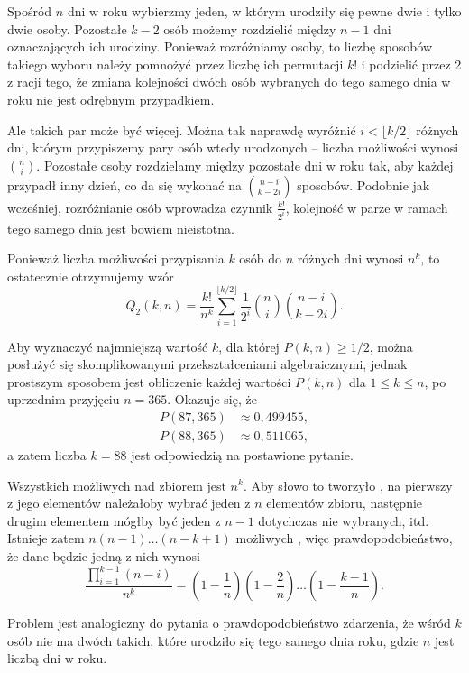 Spośród $n$ dni w roku wybierzmy jeden, w którym urodziły się pewne dwie i tylko dwie osoby. Pozostałe $k-2$ osób możemy rozdzielić między $n-1$ dni oznaczających ich urodziny. Ponieważ rozróżniamy osoby, to liczbę sposobów takiego wyboru należy pomnożyć przez liczbę ich permutacji $k!$ i podzielić przez 2 z racji tego, że zmiana kolejności dwóch osób wybranych do tego samego dnia w roku nie jest odrębnym przypadkiem.

Ale takich par może być więcej. Można tak naprawdę wyróżnić $i<\lfloor k/2\rfloor$ różnych dni, którym przypiszemy pary osób wtedy urodzonych -- liczba możliwości wynosi $\binom{n}{i}$. Pozostałe osoby rozdzielamy między pozostałe dni w roku tak, aby każdej przypadł inny dzień, co da się wykonać na $\binom{n-i}{k-2i}$ sposobów. Podobnie jak wcześniej, rozróżnianie osób wprowadza czynnik $\frac{k!}{2^i}$, kolejność w parze w ramach tego samego dnia jest bowiem nieistotna.

Ponieważ liczba możliwości przypisania $k$ osób do $n$ różnych dni wynosi $n^k$, to ostatecznie otrzymujemy wzór
\[
    Q_2(k,n) = \frac{k!}{n^k}\sum_{i=1}^{\lfloor k/2\rfloor}\frac{1}{2^i}\binom{n}{i}\binom{n-i}{k-2i}.
\]

Aby wyznaczyć najmniejszą wartość $k$, dla której $P(k,n)\ge1/2$, można posłużyć się skomplikowanymi przekształceniami algebraicznymi, jednak prostszym sposobem jest obliczenie każdej wartości $P(k,n)$ dla $1\le k\le n$, po uprzednim przyjęciu $n=365$. Okazuje się, że
\begin{align*}
	P(87,365) &\approx 0{,}499455, \\
    P(88,365) &\approx 0{,}511065,
\end{align*}
a zatem liczba $k=88$ jest odpowiedzią na postawione pytanie.

\exercise %
Wszystkich możliwych  nad zbiorem  jest $n^k$. Aby słowo to tworzyło , na pierwszy z jego elementów należałoby wybrać jeden z $n$ elementów zbioru, następnie drugim elementem mógłby być jeden z $n-1$ dotychczas nie wybranych, itd. Istnieje zatem $n(n-1)\dots(n-k+1)$ możliwych , więc prawdopodobieństwo, że dane  będzie jedną z nich wynosi
\[
	\frac{\prod_{i=1}^{k-1}(n-i)}{n^k} = \left(1-\frac{1}{n}\right)\left(1-\frac{2}{n}\right)\dots\left(1-\frac{k-1}{n}\right).
\]

Problem jest analogiczny do pytania o prawdopodobieństwo zdarzenia, że wśród $k$ osób nie ma dwóch takich, które urodziło się tego samego dnia roku, gdzie $n$ jest liczbą dni w roku.

